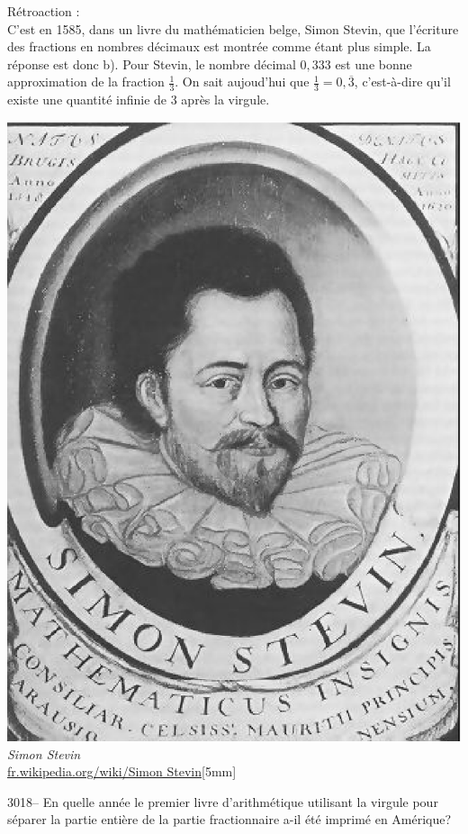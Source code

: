 \documentclass[letterpaper, 12pt]{article}
\begin{document}
R\'etroaction :\\
C'est en 1585, dans un livre du math\'ematicien belge, Simon Stevin, que l'\'ecriture des fractions en nombres d\'ecimaux est montr\'ee comme \'etant plus simple. La r\'eponse est donc b). Pour Stevin, le nombre d\'ecimal $0,333$ est une bonne approximation de la fraction $\frac{1}{3}$. On sait aujoud'hui que $\frac{1}{3} = 0,\overline3$, c'est-\`a-dire qu'il existe une quantit\'e infinie de 3 apr\`es la virgule.\\
\begin{center}
\includegraphics[scale=0.25]{stevin.eps}\\
\emph{{\small Simon Stevin}}\\
\href{http://fr.wikipedia.org/wiki/Simon Stevin}{fr.wikipedia.org/wiki/Simon Stevin}[5mm]
\end{center}



3018-- En quelle ann\'ee le premier livre d'arithm\'etique utilisant la virgule pour s\'eparer la partie enti\`ere de la partie fractionnaire a-il \'et\'e imprim\'e en Am\'erique?\\
\end{document}
